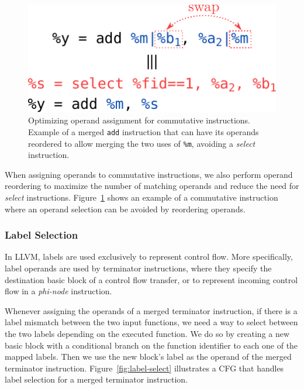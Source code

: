 \begin{figure}[t]
  \centering
  \includegraphics[scale=0.7]{src/merge-operation/figs/operand-select-reorder.pdf}
    \caption{Optimizing operand assignment for commutative instructions.
             Example of a merged \texttt{add} instruction that can have its
             operands reordered to allow merging the two uses of \texttt{\%m},
             avoiding a \textit{select} instruction.}
  \label{fig:operand-select-reorder}
\end{figure}

When assigning operands to commutative instructions, we also perform operand
reordering to maximize the number of matching operands and reduce the need for
\textit{select} instructions.
Figure~\ref{fig:operand-select-reorder} shows an example of a commutative instruction
where an operand selection can be avoided by reordering operands.

\subsubsection{Label Selection} \label{sec:label-select}

In LLVM, labels are used exclusively to represent control flow.
More specifically, label operands are used by terminator instructions, where
they specify the destination basic block of a control flow transfer, or
to represent incoming control flow in a \textit{phi-node} instruction.

Whenever assigning the operands of a merged terminator instruction, if there is
a label mismatch between the two input functions, we need a way to select
between the two labels depending on the executed function.
We do so by creating a new basic block with a conditional branch on the function
identifier to each one of the mapped labels. Then we use the new block's label as
the operand of the merged terminator instruction.
Figure~\ref{fig:label-select} illustrates a CFG that handles label selection for
a merged terminator instruction.

